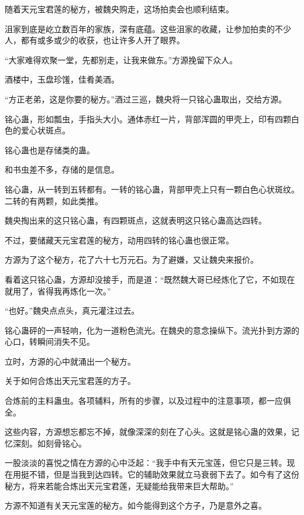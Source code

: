 
\begin{this_body}

随着天元宝君莲的秘方，被魏央购走，这场拍卖会也顺利结束。

沮家到底是屹立数百年的家族，深有底蕴。这些沮家的收藏，让参加拍卖的不少人，都有或多或少的收获，也让许多人开了眼界。

“大家难得欢聚一堂，先都别走，让我来做东。”方源挽留下众人。

酒楼中，玉盘珍馐，佳肴美酒。

“方正老弟，这是你要的秘方。”酒过三巡，魏央将一只铭心蛊取出，交给方源。

铭心蛊，形如瓢虫，手指头大小。通体赤红一片，背部浑圆的甲壳上，印有四颗白色的爱心状斑点。

铭心蛊也是存储类的蛊。

和书虫差不多，存储的是信息。

铭心蛊，从一转到五转都有。一转的铭心蛊，背部甲壳上只有一颗白色心状斑纹。二转的有两颗，如此类推。

魏央掏出来的这只铭心蛊，有四颗斑点，这就表明这只铭心蛊高达四转。

不过，要储藏天元宝君莲的秘方，动用四转的铭心蛊也很正常。

方源为了这个秘方，花了六十七万元石。为了避嫌，又让魏央来报价。

看着这只铭心蛊，方源却没接手，而是道：“既然魏大哥已经炼化了它，不如现在就用了，省得我再炼化一次。”

“也好。”魏央点点头，真元灌注过去。

铭心蛊砰的一声轻响，化为一道粉色流光。在魏央的意念操纵下。流光扑到方源的心口，转瞬间消失不见。

立时，方源的心中就涌出一个秘方。

关于如何合炼出天元宝君莲的方子。

合炼前的主料蛊虫。各项辅料，所有的步骤，以及过程中的注意事项，都一应俱全。

这些内容，方源想忘都忘不掉，就像深深的刻在了心头。这就是铭心蛊的效果，记忆深刻。如刻骨铭心。

一股淡淡的喜悦之情在方源的心中泛起：“我手中有天元宝莲，但它只是三转。现在用挺不错，但是当我到达四转。它的辅助效果就立马衰弱下去了。如今有了这份秘方，将来若能合炼出天元宝君莲，无疑能给我带来巨大帮助。”

方源不知道有关天元宝莲的秘方。如今能得到这个方子，乃是意外之喜。


\end{this_body}
